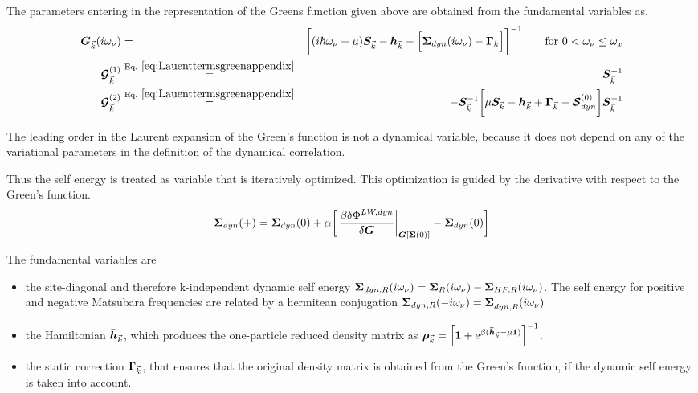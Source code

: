 \documentclass[11pt,a4paper]{report}
\begin{document}
The parameters entering in the representation
 of the Greens function given above are
obtained from the fundamental variables as.
\begin{eqnarray}
\mat{G}_{\vec{k}}(i\omega_\nu)&=&
\biggl[
(i\hbar\omega_\nu+\mu)\mat{S}_{\vec{k}}-\bar{\mat{h}}_{\vec{k}}
-
\Bigl[\mat{\Sigma}_{dyn}(i\omega_\nu)-\mat{\Gamma}_k\Bigr]
\biggr]^{-1}
\qquad\text{for $0<\omega_\nu\le\omega_x$}
\nonumber\\
\mat{\mathcal{G}}^{(1)}_{\vec{k}}
&\eqrel{eq:Lauenttermsgreenappendix}{=}&
\mat{S}_{\vec{k}}^{-1}
\nonumber\\
\mat{\mathcal{G}}^{(2)}_{\vec{k}}
&\eqrel{eq:Lauenttermsgreenappendix}{=}&
-\mat{S}_{\vec{k}}^{-1}
\biggl[\mu\mat{S}_{\vec{k}}-\bar{\mat{h}}_{\vec{k}}
+\mat{\Gamma}_{\vec{k}}-\mat{\mathcal{S}}^{(0)}_{dyn}
\biggr]
\mat{S}_{\vec{k}}^{-1}
\end{eqnarray}

The leading order in the Laurent expansion of the Green's function is
not a dynamical variable, because it does not depend on any of the
variational parameters in the definition of the dynamical correlation.


Thus the self energy is treated as variable that is iteratively
optimized. This optimization is guided by the derivative with respect
to the Green's function.
\begin{eqnarray}
\bm{\Sigma}_{dyn}(+)=\bm{\Sigma}_{dyn}(0)+\alpha
\biggl[\left.\frac{\beta\delta\Phi^{LW,dyn}}{\delta\bm{G}}
\right|_{\bm{G}[\bm{\Sigma}(0)]}
-\bm{\Sigma}_{dyn}(0)\biggr]
\end{eqnarray}


The fundamental variables are
\begin{itemize}
\item the site-diagonal and therefore k-independent dynamic self
  energy $\bm{\Sigma}_{dyn,R}(i\omega_\nu)=
  \bm{\Sigma}_{R}(i\omega_\nu)
  -\bm{\Sigma}_{HF,R}(i\omega_\nu)$. The self energy for positive and
  negative Matsubara frequencies are related by a hermitean
  conjugation
  $\bm{\Sigma}_{dyn,R}(-i\omega_\nu)=\bm{\Sigma}_{dyn,R}^\dagger(i\omega_\nu)$
%
\item the Hamiltonian $\bar{\bm{h}}_{\vec{k}}$, which produces the
  one-particle reduced density matrix as $\bm{\rho}_{\vec{k}}
  =\Bigl[\bm{1}+\mathrm{e}^{\beta(\bm{\bar{h}}_{\vec{k}}-\mu\bm{1})}\Bigr]^{-1}$.
%
\item the static correction $\bm{\Gamma}_{\vec{k}}$, that ensures
  that the original density matrix is obtained from the Green's
  function, if the dynamic self energy is taken into account.
\end{itemize}
\end{document}
